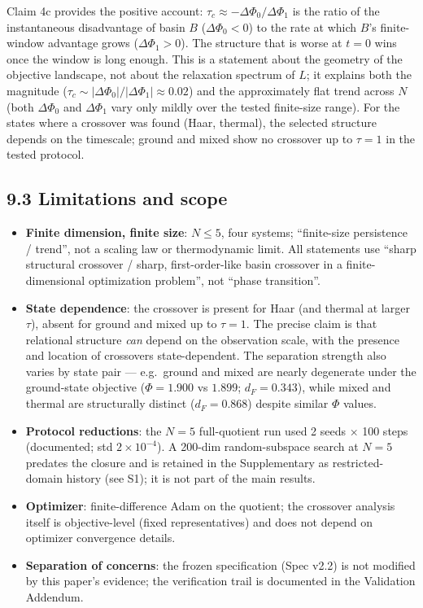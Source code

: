 \documentclass[
]{article}
\providecommand{\tightlist}{%
  \setlength{\itemsep}{0pt}\setlength{\parskip}{0pt}}
\begin{document}
Claim 4c provides the positive account: \(\tau_c \approx
-\Delta\Phi_0/\Delta\Phi_1\) is the ratio of the instantaneous
disadvantage of basin \(B\) (\(\Delta\Phi_0 < 0\)) to the rate at which
\(B\)'s finite-window advantage grows (\(\Delta\Phi_1 > 0\)). The
structure that is worse at \(t=0\) wins once the window is long enough.
This is a statement about the geometry of the objective landscape, not
about the relaxation spectrum of \(L\); it explains both the magnitude
(\(\tau_c \sim |\Delta\Phi_0| /
|\Delta\Phi_1| \approx 0.02\)) and the approximately flat trend across
\(N\) (both \(\Delta\Phi_0\) and \(\Delta\Phi_1\) vary only mildly over
the tested finite-size range). For the states where a crossover was
found (Haar, thermal), the selected structure depends on the timescale;
ground and mixed show no crossover up to \(\tau = 1\) in the tested
protocol.

\subsection{9.3 Limitations and scope}\label{limitations-and-scope}

\begin{itemize}
\tightlist
\item
  \textbf{Finite dimension, finite size}: \(N \le 5\), four systems;
  ``finite-size persistence / trend'', not a scaling law or
  thermodynamic limit. All statements use ``sharp structural crossover /
  sharp, first-order-like basin crossover in a finite-dimensional
  optimization problem'', not ``phase transition''.
\item
  \textbf{State dependence}: the crossover is present for Haar (and
  thermal at larger \(\tau\)), absent for ground and mixed up to
  \(\tau=1\). The precise claim is that relational structure \emph{can}
  depend on the observation scale, with the presence and location of
  crossovers state-dependent. The separation strength also varies by
  state pair --- e.g.~ground and mixed are nearly degenerate under the
  ground-state objective (\(\Phi = 1.900\) vs \(1.899\);
  \(d_F = 0.343\)), while mixed and thermal are structurally distinct
  (\(d_F = 0.868\)) despite similar \(\Phi\) values.
\item
  \textbf{Protocol reductions}: the \(N=5\) full-quotient run used 2
  seeds × 100 steps (documented; std \(2\times10^{-4}\)). A 200-dim
  random-subspace search at \(N=5\) predates the closure and is retained
  in the Supplementary as restricted-domain history (see S1); it is not
  part of the main results.
\item
  \textbf{Optimizer}: finite-difference Adam on the quotient; the
  crossover analysis itself is objective-level (fixed representatives)
  and does not depend on optimizer convergence details.
\item
  \textbf{Separation of concerns}: the frozen specification (Spec v2.2)
  is not modified by this paper's evidence; the verification trail is
  documented in the Validation Addendum.
\end{itemize}
\end{document}
